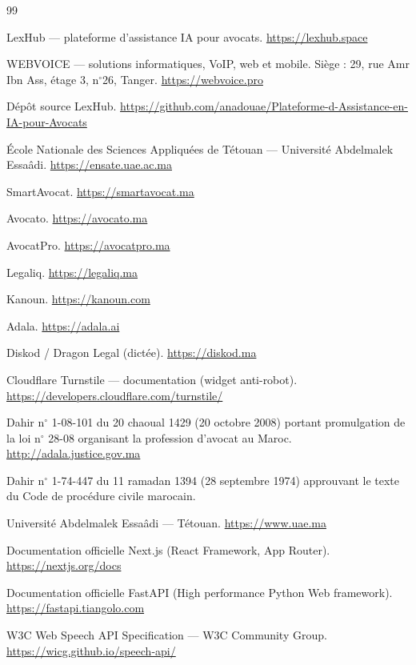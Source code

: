 \renewcommand{\bibname}{Bibliographie / Webographie}

\begin{thebibliography}{99}

LexHub --- plateforme d'assistance IA pour avocats.
\url{https://lexhub.space}

WEBVOICE --- solutions informatiques, VoIP, web et mobile. Siège : 29, rue Amr Ibn Ass, étage 3, n$^\circ$26, Tanger.
\url{https://webvoice.pro}

Dépôt source LexHub.
\url{https://github.com/anadouae/Plateforme-d-Assistance-en-IA-pour-Avocats}

École Nationale des Sciences Appliquées de Tétouan --- Université Abdelmalek Essaâdi.
\url{https://ensate.uae.ac.ma}

SmartAvocat.
\url{https://smartavocat.ma}

Avocato.
\url{https://avocato.ma}

AvocatPro.
\url{https://avocatpro.ma}

Legaliq.
\url{https://legaliq.ma}

Kanoun.
\url{https://kanoun.com}

Adala.
\url{https://adala.ai}

Diskod / Dragon Legal (dictée).
\url{https://diskod.ma}

Cloudflare Turnstile --- documentation (widget anti-robot).
\url{https://developers.cloudflare.com/turnstile/}

Dahir n$^{\circ}$ 1-08-101 du 20 chaoual 1429 (20 octobre 2008) portant promulgation de la loi n$^{\circ}$ 28-08 organisant la profession d'avocat au Maroc.
\url{http://adala.justice.gov.ma}

Dahir n$^{\circ}$ 1-74-447 du 11 ramadan 1394 (28 septembre 1974) approuvant le texte du Code de procédure civile marocain.

Université Abdelmalek Essaâdi --- Tétouan.
\url{https://www.uae.ma}

Documentation officielle Next.js (React Framework, App Router).
\url{https://nextjs.org/docs}

Documentation officielle FastAPI (High performance Python Web framework).
\url{https://fastapi.tiangolo.com}

W3C Web Speech API Specification --- W3C Community Group.
\url{https://wicg.github.io/speech-api/}

\end{thebibliography}
